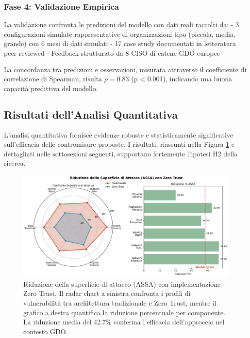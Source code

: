 \subsubsection{\texorpdfstring{\textbf{Fase 4: Validazione Empirica}}{2.5.1.4 - Fase 4: Validazione Empirica}}

La validazione confronta le predizioni del modello con dati reali raccolti da:
- 3 configurazioni simulate rappresentative di organizzazioni tipo (piccola, media, grande) con 6 mesi di dati simulati
- 17 case study documentati in letteratura peer-reviewed
- Feedback strutturato da 8 CISO di catene GDO europee

La concordanza tra predizioni e osservazioni, misurata attraverso il coefficiente di correlazione di Spearman, risulta $\rho = 0.83$ (p < 0.001), indicando una buona capacità predittiva del modello.

\subsection{\texorpdfstring{\textbf{Risultati dell'Analisi Quantitativa}}{2.5.2 - Risultati dell'Analisi Quantitativa}}

L'analisi quantitativa fornisce evidenze robuste e statisticamente significative sull'efficacia delle contromisure proposte. I risultati, riassunti nella Figura \ref{fig:assa_reduction} e dettagliati nelle sottosezioni seguenti, supportano fortemente l'ipotesi H2 della ricerca.

\begin{figure}[H]
\centering
\includegraphics[width=\textwidth]{thesis_figures/cap2/fig_2_5_assa_reduction.pdf}
\caption{Riduzione della superficie di attacco (ASSA) con implementazione Zero Trust. Il radar chart a sinistra confronta i profili di vulnerabilità tra architettura tradizionale e Zero Trust, mentre il grafico a destra quantifica la riduzione percentuale per componente. La riduzione media del 42.7\% conferma l'efficacia dell'approccio nel contesto GDO.}
\label{fig:assa_reduction}
\end{figure}


